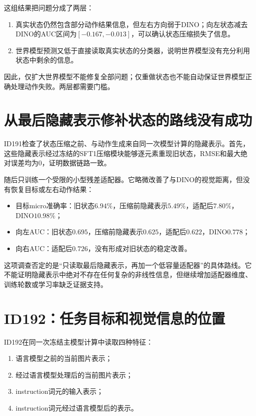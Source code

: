 \documentclass[UTF8,11pt,a4paper,fontset=none]{ctexart}
\begin{document}
这组结果把问题分成了两层：

\begin{enumerate}
  \item 真实状态仍然包含部分动作结果信息，但左右方向弱于DINO；向左状态减去DINO的AUC区间为$[-0.167,-0.013]$，可以确认状态压缩损失了信息。
  \item 世界模型预测又低于直接读取真实状态的分类器，说明世界模型没有充分利用状态中剩余的信息。
\end{enumerate}

因此，仅扩大世界模型不能修复全部问题；仅重做状态也不能自动保证世界模型正确处理动作失败。两层都需要门槛。

\section{从最后隐藏表示修补状态的路线没有成功}

ID191检查了状态压缩之前、与动作生成来自同一次模型计算的隐藏表示。首先，这些隐藏表示经过冻结的SFT1压缩模块能够逐元素重现旧状态，RMSE和最大绝对误差均为0，证明数据链路一致。

随后只训练一个受限的小型残差适配器。它略微改善了与DINO的视觉距离，但没有恢复目标或左右动作结果：

\begin{itemize}
  \item 目标micro准确率：旧状态$6.94\%$，压缩前隐藏表示$5.49\%$，适配后$7.80\%$，DINO$10.98\%$；
  \item 向左AUC：旧状态$0.695$，压缩前隐藏表示$0.625$，适配后$0.622$，DINO$0.778$；
  \item 向右AUC：适配后$0.726$，没有形成对旧状态的稳定改善。
\end{itemize}

这项调查否定的是“只读取最后隐藏表示，再加一个低容量适配器”的具体路线。它不能证明隐藏表示中绝对不存在任何复杂的非线性信息，但继续增加适配器维度、训练轮数或学习率缺乏证据支持。

\section{ID192：任务目标和视觉信息的位置}

ID192在同一次冻结主模型计算中读取四种特征：

\begin{enumerate}
  \item 语言模型之前的当前图片表示；
  \item 经过语言模型处理后的当前图片表示；
  \item instruction词元的输入表示；
  \item instruction词元经过语言模型后的表示。
\end{enumerate}
\end{document}
